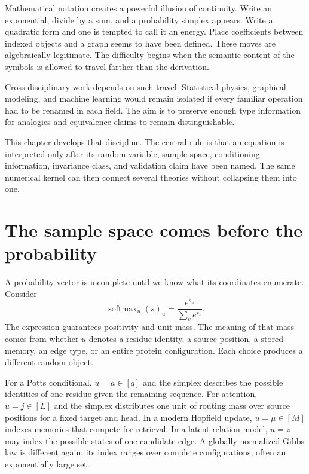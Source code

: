 Mathematical notation creates a powerful illusion of continuity.  Write an exponential, divide by
a sum, and a probability simplex appears.  Write a quadratic form and one is tempted to call it an
energy.  Place coefficients between indexed objects and a graph seems to have been defined.  These
moves are algebraically legitimate.  The difficulty begins when the semantic content of the
symbols is allowed to travel farther than the derivation.

Cross-disciplinary work depends on such travel.  Statistical physics, graphical modeling, and
machine learning would remain isolated if every familiar operation had to be renamed in each
field.  The aim is to preserve enough type information for analogies and equivalence claims to
remain distinguishable.

This chapter develops that discipline.  The central rule is that an equation is interpreted only
after its random variable, sample space, conditioning information, invariance class, and validation
claim have been named.  The same numerical kernel can then connect several theories without
collapsing them into one.

\section{The sample space comes before the probability}

A probability vector is incomplete until we know what its coordinates enumerate.  Consider
\begin{equation}
\operatorname{softmax}_{u}(s)_u
=\frac{e^{s_u}}{\sum_v e^{s_v}}.
\label{eq:book-generic-softmax}
\end{equation}
The expression guarantees positivity and unit mass.  The meaning of that mass comes from whether
$u$ denotes a residue identity, a source position, a stored memory, an edge type, or an entire
protein configuration.
Each choice produces a different random object.

For a Potts conditional, $u=a\in[q]$ and the simplex describes the possible identities of one
residue given the remaining sequence.  For attention, $u=j\in[L]$ and the simplex distributes one
unit of routing mass over source positions for a fixed target and head.  In a modern Hopfield
update, $u=\mu\in[M]$ indexes memories that compete for retrieval.  In a latent relation model,
$u=z$ may index the possible states of one candidate edge.  A globally normalized Gibbs law is
different again: its index ranges over complete configurations, often an exponentially large set.

